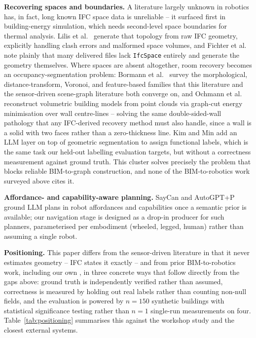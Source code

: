 \documentclass[a4paper, 10pt, conference]{ieeeconf}
\begin{document}
\textbf{Recovering spaces and boundaries.} A literature largely unknown in robotics has, in fact, long known IFC space data is unreliable -- it surfaced first in building-energy simulation, which needs second-level space boundaries for thermal analysis. Lilis et al.\ \cite{lilis2017spaceboundary} generate that topology from raw IFC geometry, explicitly handling clash errors and malformed space volumes, and Fichter et al.\ \cite{fichter2021spaceboundary} note plainly that many delivered files lack \texttt{IfcSpace} entirely and generate the geometry themselves. Where spaces are absent altogether, room recovery becomes an occupancy-segmentation problem: Bormann et al.\ \cite{bormann2016roomseg} survey the morphological, distance-transform, Voronoi, and feature-based families that this literature and the sensor-driven scene-graph literature both converge on, and Ochmann et al.\ \cite{ochmann2016parametric} reconstruct volumetric building models from point clouds via graph-cut energy minimisation over wall centre-lines -- solving the same double-sided-wall pathology that any IFC-derived recovery method must also handle, since a wall is a solid with two faces rather than a zero-thickness line. Kim and Min \cite{kim2024semanticlayering} add an LLM layer on top of geometric segmentation to assign functional labels, which is the same task our held-out labelling evaluation targets, but without a correctness measurement against ground truth. This cluster solves precisely the problem that blocks reliable BIM-to-graph construction, and none of the BIM-to-robotics work surveyed above cites it.

\textbf{Affordance- and capability-aware planning.} SayCan \cite{ahn2022saycan} and AutoGPT+P \cite{birr2024autogptp} ground LLM plans in robot affordances and capabilities once a semantic prior is available; our navigation stage is designed as a drop-in producer for such planners, parameterised per embodiment (wheeled, legged, human) rather than assuming a single robot.

\textbf{Positioning.} This paper differs from the sensor-driven literature in that it never estimates geometry -- IFC states it exactly -- and from prior BIM-to-robotics work, including our own \cite{nedungadi2026robobimws}, in three concrete ways that follow directly from the gaps above: ground truth is independently verified rather than assumed, correctness is measured by holding out real labels rather than counting non-null fields, and the evaluation is powered by $n=150$ synthetic buildings with statistical significance testing rather than $n=1$ single-run measurements on four. Table~\ref{tab:positioning} summarises this against the workshop study and the closest external systems.
\end{document}
